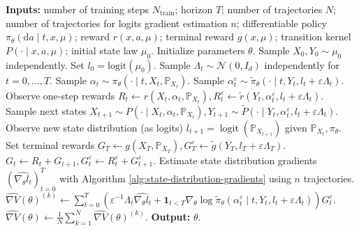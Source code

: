 \documentclass[11pt]{article}
\numberwithin{equation}{section}
\theoremstyle{definition}
\theoremstyle{remark}
\def\eps{\varepsilon}
\def\d{{\mathrm{d}}}
\DeclareMathOperator*{\logit}{logit}
\begin{document}
\begin{algorithm}[H]
\caption{Mean-Field REINFORCE for Finite-Horizon MFMDP}
\label{alg:reinforce}
\begin{algorithmic}[1]
\State \textbf{Inputs:} number of training steps $N_\text{train}$; horizon $T$; number of trajectories $N$; number of trajectories for logits gradient estimation $n$; differentiable policy $\pi_\theta(\d a\mid t,x,\mu)$; reward $r(x,a,\mu)$; terminal reward $g(x,\mu)$; transition kernel $P(\cdot\mid x,a,\mu)$; initial state law $\mu_0$.
\State Initialize parameters $\theta$.
    \State Sample $X_0,Y_0 \sim \mu_0$ independently.
    \State Set $ l_0 = \mathrm{logit}(\mu_0)$.
    \State Sample $\Lambda_t \sim \mathcal N(0,I_d)$ independently for $t = 0, \ldots, T$.
     
        \State Sample $\alpha_t \sim \pi_\theta(\cdot \mid t,X_t,\mathbb P_{X_t})$.
        \State Sample $\alpha^\eps_t \sim \tilde \pi_\theta(\cdot \mid t,Y_t, l_t + \eps \Lambda_t)$.
        \State Observe one-step rewards $R_t \gets r(X_t, \alpha_t,\mathbb P_{X_t}), R_t^\eps \gets \tilde r(Y_t, \alpha_t^\eps,  l_t + \eps \Lambda_t)$.
        \State Sample next states $X_{t+1} \sim P(\cdot \mid X_t, \alpha_t, \mathbb P_{X_t}), Y_{t + 1} \sim \tilde P(\cdot \mid Y_t, \alpha_t^\eps,  l_t + \eps \Lambda_t)$.
        \State Observe new state distribution (as logits) $l_{t + 1} = \logit (\mathbb P_{X_{t + 1}})$ given $\mathbb P_{X_t}, \pi_\theta$.
    \EndFor
    \State Set terminal rewards $G_T \gets g(X_T,\mathbb P_{X_T}), G_T^\eps \gets \tilde g(Y_T, l_T + \eps \Lambda_T)$.
     
        \State $G_t \gets R_t + G_{t+1}, G^\eps_{t} \gets R_t^\eps + G^\eps_{t + 1}.$ 
    \EndFor
    \State Estimate state distribution gradients $\left(\widehat{\nabla_\theta l_t}\right)_{t=0}^{T}$ with Algorithm \ref{alg:state-distribution-gradients} using $n$ trajectories.
    \State $\widehat{\nabla V}(\theta)^{(k)} \gets \displaystyle \sum_{t=0}^{T} \left(\eps^{-1} \Lambda_t \widehat{\nabla_\theta l_t} + \mathbf 1 _{t < T}\nabla_\theta \log \tilde \pi_\theta(\alpha_t^\eps \mid t,Y_t, l_t + \eps \Lambda_t) \right)G_t^\eps$. 
\EndFor
\State $\widehat{\nabla V}(\theta) \gets \frac{1}{N} \sum_{k=1}^N \widehat{\nabla V}(\theta)^{(k)}$.
\EndFor
\State \textbf{Output:} $\theta$.
\end{algorithmic}
\end{algorithm}
\end{document}
